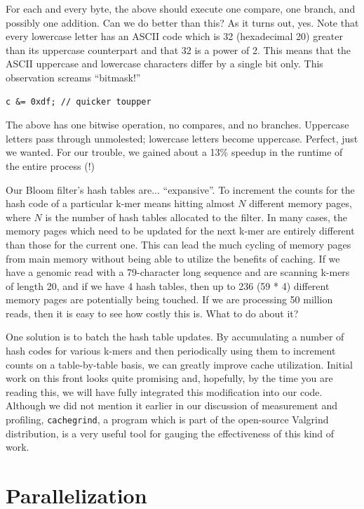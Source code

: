 \documentclass{article}
\begin{document}
For each and every byte, the above should execute one compare, one branch, and
possibly one addition. Can we do better than this? As it turns out, yes. Note
that every lowercase letter has an ASCII code which is 32 (hexadecimal 20)
greater than its uppercase counterpart and that 32 is a power of 2. This means
that the ASCII uppercase and lowercase characters differ by a single bit only.
This observation screams ``bitmask!''

\begin{verbatim}
c &= 0xdf; // quicker toupper
\end{verbatim}

The above has one bitwise operation, no compares, and no branches. Uppercase
letters pass through unmolested; lowercase letters become uppercase. Perfect,
just we wanted. For our trouble, we gained about a 13\% speedup in the
runtime of the entire process (!)

Our Bloom filter's hash tables are... ``expansive''. To increment the counts
for the hash code of a particular k-mer means hitting almost $N$ different
memory pages, where $N$ is the number of hash tables allocated to the filter.
In many cases, the memory pages which need to be updated for the next k-mer are
entirely different than those for the current one. This can lead the much
cycling of memory pages from main memory without being able to utilize the
benefits of caching. If we have a genomic read with a 79-character long
sequence and are scanning k-mers of length 20, and if we have 4 hash tables,
then up to 236 (59 * 4) different memory pages are potentially being touched.
If we are processing 50 million reads, then it is easy to see how costly this
is. What to do about it?

One solution is to batch the hash table updates. By accumulating a number of
hash codes for various k-mers and then periodically using them to increment
counts on a table-by-table basis, we can greatly improve cache utilization.
Initial work on this front looks quite promising and, hopefully, by the time
you are reading this, we will have fully integrated this modification into our
code. Although we did not mention it earlier in our discussion of measurement
and profiling, \texttt{cachegrind}, a program which is part of the open-source
Valgrind \citep{web:Valgrind} distribution, is a very useful tool for gauging
the effectiveness of this kind of work.

\section{Parallelization}
\end{document}
